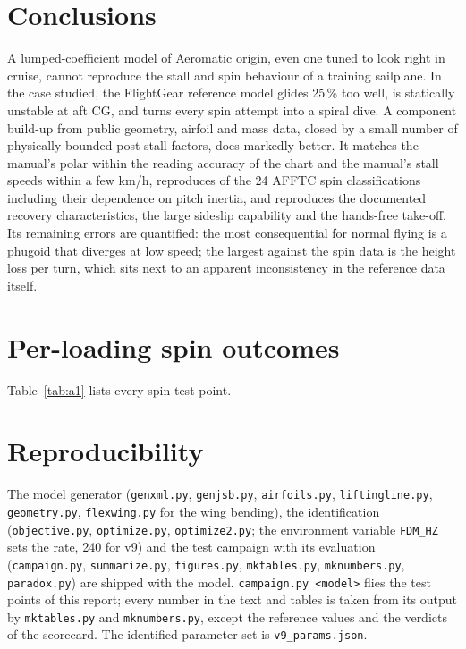 \documentclass[10pt,a4paper,twocolumn]{article}
\newcommand{\Tab}[1]{}
\newcommand{\vnine}{v9}
\begin{document}
\section{Conclusions}
A lumped-coefficient model of Aeromatic origin, even one tuned to look right in cruise, cannot reproduce the stall and spin
behaviour of a training sailplane. In the case studied, the FlightGear reference model glides 25\,\% too well, is statically unstable at
aft CG, and turns every spin attempt into a spiral dive. A component build-up from public geometry, airfoil and mass data, closed by a
small number of physically bounded post-stall factors, does markedly better. It matches the manual's polar within the reading accuracy of
the chart and the manual's stall speeds within a few km/h, reproduces \NmatchNine{} of the 24 AFFTC spin classifications including their
dependence on pitch inertia, and reproduces the documented recovery characteristics, the large sideslip capability and the hands-free
take-off. Its remaining errors are quantified: the most consequential for normal flying is a phugoid that diverges at low speed; the
largest against the spin data is the height loss per turn, which sits next to an apparent inconsistency in the reference data itself.

\appendix
\section{Per-loading spin outcomes}\label{app:a1}
\begin{table}[t]
\centering\small
\caption{All 24 AFFTC loadings: pilot masses (lb), number of tail / cockpit ballast weights, $I_{yy}$ ($10^6$\,lb\,in$^2$), the AFFTC
expectation (Eqs.~\ref{eq:inc}--\ref{eq:sus}) and each model's outcome per entry technique (I = incipient, S = sustained, small
numbers = spinning turns within 40\,s; -- = no spin).}
\label{tab:a1}
\Tab{a1}
\end{table}
Table~\ref{tab:a1} lists every spin test point.

\section{Reproducibility}
The model generator (\texttt{genxml.py}, \texttt{genjsb.py}, \texttt{airfoils.py}, \texttt{liftingline.py},
\texttt{geometry.py}, \texttt{flexwing.py} for the wing bending), the identification (\texttt{objective.py}, \texttt{optimize.py},
\texttt{optimize2.py}; the environment variable \texttt{FDM\_HZ} sets the rate, 240 for \vnine) and the test
campaign with its evaluation (\texttt{campaign.py}, \texttt{summarize.py}, \texttt{figures.py}, \texttt{mktables.py},
\texttt{mknumbers.py}, \texttt{paradox.py}) are shipped with the model. \texttt{campaign.py <model>} flies the \NnTests{} test points of
this report; every number in the text and tables is taken from its output by \texttt{mktables.py} and \texttt{mknumbers.py}, except
the reference values and the verdicts of the scorecard. The identified parameter set is \texttt{v9\_params.json}.
\end{document}
